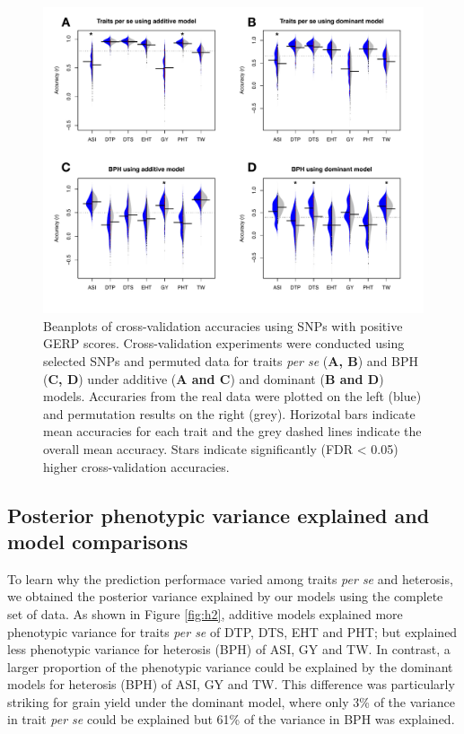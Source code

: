 \documentclass[9pt,twocolumn,twoside]{gsajnl}
\begin{document}
\begin{figure}[htbp]
\centering
\includegraphics[width=\linewidth]{Figure_gerpall_m.pdf}
\caption{Beanplots of cross-validation accuracies using SNPs with positive GERP scores. Cross-validation experiments were conducted using selected SNPs and permuted data for traits \emph{per se} (\textbf{A, B}) and BPH (\textbf{C, D}) under additive (\textbf{A and C}) and dominant (\textbf{B and D}) models. Accuraries from the real data were plotted on the left (blue) and permutation results on the right (grey). Horizotal bars indicate mean accuracies for each trait and the grey dashed lines indicate the overall mean accuracy. Stars indicate significantly (FDR < 0.05) higher cross-validation accuracies.  }
\label{fig:gerpall}
\end{figure}

\subsection*{Posterior phenotypic variance explained and model comparisons}

To learn why the prediction performace varied among traits \emph{per se} and heterosis, we obtained the posterior variance explained by our models using the complete set of data. 
As shown in Figure \ref{fig:h2}, additive models explained more phenotypic variance for traits \emph{per se} of DTP, DTS, EHT and PHT; but explained less phenotypic variance for heterosis (BPH) of ASI, GY and TW. 
In contrast, a larger proportion of the phenotypic variance could be explained by the dominant models for heterosis (BPH) of ASI, GY and TW. 
This difference was particularly striking for grain yield under the dominant model, where only 3\% of the variance in trait \emph{per se} could be explained but 61\% of the variance in BPH was explained. 
\end{document}
